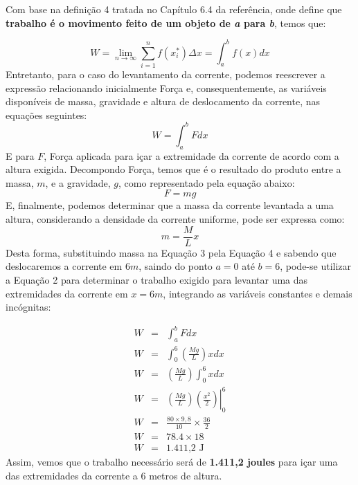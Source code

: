\documentclass[12pt]{article}
\begin{document}
Com base na definição 4 tratada no Capítulo 6.4 da referência, onde define que \textbf{trabalho é o movimento feito de um objeto de \emph{a} para \emph{b}}, temos que:\par
\begin{equation}
    \displaystyle W = \lim\limits_{n \to \infty} \sum_{i=1}^{n}f(x_i^*)\Delta x = \int_a^b f(x)dx
\end{equation}
Entretanto, para o caso do levantamento da corrente, podemos reescrever a expressão relacionando inicialmente Força e, consequentemente, as variáveis disponíveis de massa, gravidade e altura de deslocamento da corrente, nas equações seguintes:
\begin{equation}
    \displaystyle W = \int_{a}^{b}Fdx
\end{equation}
E para $F$, Força aplicada para içar a extremidade da corrente de acordo com a altura exigida. Decompondo Força, temos que é o resultado do produto entre a massa, $m$, e a gravidade, $g$, como representado pela equação abaixo:
\begin{equation}
    \displaystyle F = mg
\end{equation}
E, finalmente, podemos determinar que a massa da corrente levantada a uma altura, considerando a densidade da corrente uniforme, pode ser expressa como:
\begin{equation}
    \displaystyle m = \frac{M}{L}x
\end{equation}
Desta forma, substituindo massa na Equação 3 pela Equação 4 e sabendo que deslocaremos a corrente em $6m$, saindo do ponto $a = 0$ até $b = 6$, pode-se utilizar a Equação 2 para determinar o trabalho exigido para levantar uma das extremidades da corrente em $x=6m$, integrando as variáveis constantes e demais incógnitas:\par
\begin{eqnarray}
    \displaystyle W & = &\int_{a}^{b}Fdx \\ \nonumber
    \displaystyle W & = &\int_{0}^{6}\left(\frac{Mg}{L}\right)xdx \\ \nonumber
    \displaystyle W & = &\left(\frac{Mg}{L}\right)\int_{0}^{6}xdx \\ \nonumber
    \displaystyle W & = &\left.\left(\frac{Mg}{L}\right)\left(\frac{x^2}{2}\right)\right|_0^6 \\ \nonumber
    \displaystyle W & = &\frac{80 \times 9,8}{10} \times \frac{36}{2} \\ \nonumber
    \displaystyle W & = & 78.4 \times 18 \\ \nonumber
    \displaystyle W & = & \textrm{1.411,2 J}
\end{eqnarray}
Assim, vemos que o trabalho necessário será de \textbf{1.411,2 joules} para içar uma das extremidades da corrente a 6 metros de altura.\par \vspace{0.25cm}
\end{document}
